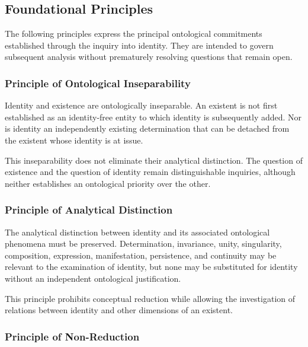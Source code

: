 
\subsection{Foundational Principles}

The following principles express the principal ontological
commitments established through the inquiry into identity.
They are intended to govern subsequent analysis without
prematurely resolving questions that remain open.

\subsubsection{Principle of Ontological Inseparability}

Identity and existence are ontologically inseparable.
An existent is not first established as an identity-free
entity to which identity is subsequently added. Nor is
identity an independently existing determination that
can be detached from the existent whose identity is at
issue.

This inseparability does not eliminate their analytical
distinction. The question of existence and the question
of identity remain distinguishable inquiries, although
neither establishes an ontological priority over the other.

\subsubsection{Principle of Analytical Distinction}

The analytical distinction between identity and its
associated ontological phenomena must be preserved.
Determination, invariance, unity, singularity, composition,
expression, manifestation, persistence, and continuity
may be relevant to the examination of identity, but none
may be substituted for identity without an independent
ontological justification.

This principle prohibits conceptual reduction while
allowing the investigation of relations between identity
and other dimensions of an existent.

\subsubsection{Principle of Non-Reduction}

